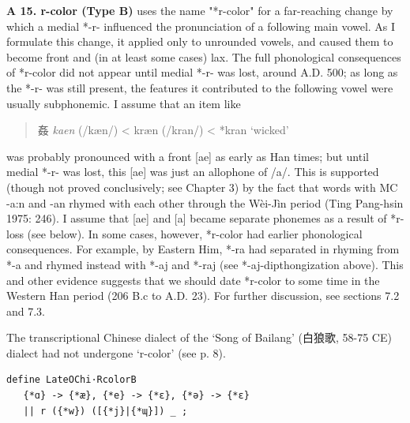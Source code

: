 \documentclass[xetex, svgnames, 12pt]{scrartcl}
\newcounter{para}
\newcommand\mypara[1]{\par\refstepcounter{para}\textbf{\thepara\space#1\space}}
\begin{document}
\mypara{A 15. r-color (Type B)}
\citet[543-544]{Baxter1992}
uses the name "*r-color" for a far-reaching change by which a medial *-r- influenced the
 pronunciation of a following main vowel. As I formulate this change, it applied only to
 unrounded vowels, and caused them to become front and (in at least some cases) lax. The
 full phonological consequences of *r-color did not appear until medial *-r- was lost,
 around A.D. 500; as long as the *-r- was still present, the features it contributed to the
 following vowel were usually subphonemic. I assume that an item like
 \begin{quote}
姦 %
\textit{kaen} (/kæn/) < kræn (/kran/) < *kran `wicked'
 \end{quote}
 was probably pronounced with a front [ae] as early as Han times; but until medial *-r- was
 lost, this [ae] was just an allophone of /a/. This is supported (though not proved
 conclusively; see Chapter 3) by the fact that words with MC -a:n and -an rhymed with each
 other through the Wèi-Jìn period (Ting Pang-hsin 1975: 246). I assume that [ae] and [a]
 became separate phonemes as a result of *r-loss (see below).
 In some cases, however, *r-color had earlier phonological consequences. For example,
 by Eastern Him, *-ra had separated in rhyming from *-a and rhymed instead with *-aj and
 *-raj (see *-aj-dipthongization above). This and other evidence suggests that we should
 date *r-color to some time in the Western Han period (206 B.c to A.D. 23). For further
 discussion, see sections 7.2 and 7.3.

The transcriptional Chinese dialect of the `Song of Bailang' (白狼歌, 58-75 CE) dialect had not undergone 
 `r-color' (see p. 8). 

\begin{verbatim}
define LateOChi·RcolorB
   {*ɑ} -> {*æ}, {*e} -> {*ɛ}, {*ə} -> {*ɛ} 
   || r ({*w}) ([{*j}|{*ɰ}]) _ ;
\end{verbatim} 
\end{document}

